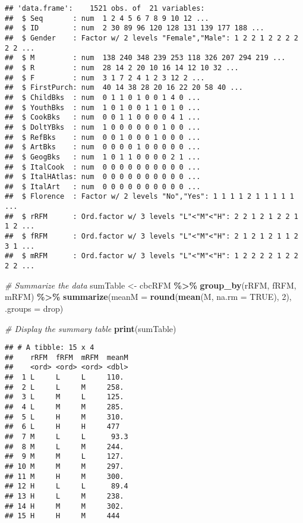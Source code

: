 \documentclass[
]{article}
\newenvironment{Shaded}{\begin{snugshade}}{\end{snugshade}}
\newcommand{\AttributeTok}[1]{\textcolor[rgb]{0.13,0.29,0.53}{#1}}
\newcommand{\CommentTok}[1]{\textcolor[rgb]{0.56,0.35,0.01}{\textit{#1}}}
\newcommand{\ConstantTok}[1]{\textcolor[rgb]{0.56,0.35,0.01}{#1}}
\newcommand{\DecValTok}[1]{\textcolor[rgb]{0.00,0.00,0.81}{#1}}
\newcommand{\FunctionTok}[1]{\textcolor[rgb]{0.13,0.29,0.53}{\textbf{#1}}}
\newcommand{\NormalTok}[1]{#1}
\newcommand{\OtherTok}[1]{\textcolor[rgb]{0.56,0.35,0.01}{#1}}
\newcommand{\SpecialCharTok}[1]{\textcolor[rgb]{0.81,0.36,0.00}{\textbf{#1}}}
\newcommand{\StringTok}[1]{\textcolor[rgb]{0.31,0.60,0.02}{#1}}
\begin{document}
\begin{verbatim}
## 'data.frame':    1521 obs. of  21 variables:
##  $ Seq       : num  1 2 4 5 6 7 8 9 10 12 ...
##  $ ID        : num  2 30 89 96 120 128 131 139 177 188 ...
##  $ Gender    : Factor w/ 2 levels "Female","Male": 1 2 2 1 2 2 2 2 2 2 ...
##  $ M         : num  138 240 348 239 253 118 326 207 294 219 ...
##  $ R         : num  28 14 2 20 10 16 14 12 10 32 ...
##  $ F         : num  3 1 7 2 4 1 2 3 12 2 ...
##  $ FirstPurch: num  40 14 38 28 20 16 22 20 58 40 ...
##  $ ChildBks  : num  0 1 1 0 1 0 0 1 4 0 ...
##  $ YouthBks  : num  1 0 1 0 0 1 1 0 1 0 ...
##  $ CookBks   : num  0 0 1 1 0 0 0 0 4 1 ...
##  $ DoltYBks  : num  1 0 0 0 0 0 0 1 0 0 ...
##  $ RefBks    : num  0 0 1 0 0 0 1 0 0 0 ...
##  $ ArtBks    : num  0 0 0 0 1 0 0 0 0 0 ...
##  $ GeogBks   : num  1 0 1 1 0 0 0 0 2 1 ...
##  $ ItalCook  : num  0 0 0 0 0 0 0 0 0 0 ...
##  $ ItalHAtlas: num  0 0 0 0 0 0 0 0 0 0 ...
##  $ ItalArt   : num  0 0 0 0 0 0 0 0 0 0 ...
##  $ Florence  : Factor w/ 2 levels "No","Yes": 1 1 1 1 2 1 1 1 1 1 ...
##  $ rRFM      : Ord.factor w/ 3 levels "L"<"M"<"H": 2 2 1 2 1 2 2 1 1 2 ...
##  $ fRFM      : Ord.factor w/ 3 levels "L"<"M"<"H": 2 1 2 1 2 1 1 2 3 1 ...
##  $ mRFM      : Ord.factor w/ 3 levels "L"<"M"<"H": 1 2 2 2 2 1 2 2 2 2 ...
\end{verbatim}

\begin{Shaded}
\begin{Highlighting}[]
\CommentTok{\# Summarize the data}
\NormalTok{sumTable }\OtherTok{\textless{}{-}}\NormalTok{ cbcRFM }\SpecialCharTok{\%\textgreater{}\%} 
  \FunctionTok{group\_by}\NormalTok{(rRFM, fRFM, mRFM) }\SpecialCharTok{\%\textgreater{}\%}
  \FunctionTok{summarize}\NormalTok{(}\AttributeTok{meanM =} \FunctionTok{round}\NormalTok{(}\FunctionTok{mean}\NormalTok{(M, }\AttributeTok{na.rm =} \ConstantTok{TRUE}\NormalTok{), }\DecValTok{2}\NormalTok{), }\AttributeTok{.groups =} \StringTok{\textquotesingle{}drop\textquotesingle{}}\NormalTok{)}

\CommentTok{\# Display the summary table}
\FunctionTok{print}\NormalTok{(sumTable)}
\end{Highlighting}
\end{Shaded}

\begin{verbatim}
## # A tibble: 15 x 4
##    rRFM  fRFM  mRFM  meanM
##    <ord> <ord> <ord> <dbl>
##  1 L     L     L     110. 
##  2 L     L     M     258. 
##  3 L     M     L     125. 
##  4 L     M     M     285. 
##  5 L     H     M     310. 
##  6 L     H     H     477  
##  7 M     L     L      93.3
##  8 M     L     M     244. 
##  9 M     M     L     127. 
## 10 M     M     M     297. 
## 11 M     H     M     300. 
## 12 H     L     L      89.4
## 13 H     L     M     238. 
## 14 H     M     M     302. 
## 15 H     H     M     444
\end{verbatim}
\end{document}
